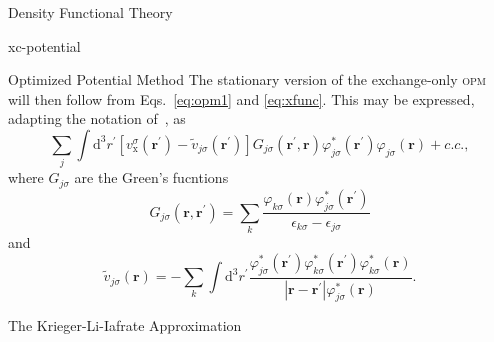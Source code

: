 \documentclass[letterpaper, 11 pt]{report}
\begin{document}
\begin{chapter}{Density Functional Theory \label{chap:dft}}
\begin{section}{xc-potential \label{sec:xcpot}}
\begin{subsection}{Optimized Potential Method \label{sec:opm}}
         The stationary version of the exchange-only \textsc{opm} will then follow from
         Eqs.~\eqref{eq:opm1} and \eqref{eq:xfunc}. This may be expressed, adapting the notation
         of~\cite{klieq}, as
         \begin{equation} \label{eq:opmEq}
            \sum\limits_j \int \mathrm{d}^3 r^\prime
            \left[ v^\sigma_\mathrm{x}(\mathbf{r}^\prime)
                 - \tilde{v}_{j \sigma} (\mathbf{r}^\prime) \right]
                 G_{j \sigma}(\mathbf{r}^\prime, \mathbf{r}) \varphi^*_{j \sigma} (\mathbf{r}^\prime)
                 \varphi_{j \sigma} (\mathbf{r}) + c.c.,
         \end{equation}
         where $G_{j \sigma}$ are the Green's fucntions
         \begin{equation}
            G_{j \sigma}(\mathbf{r}, \mathbf{r}^\prime) = \sum\limits_k
            \frac{\varphi_{k \sigma} (\mathbf{r}) \varphi^*_{j \sigma} (\mathbf{r}^\prime)}
            {\epsilon_{k \sigma} - \epsilon_{j \sigma}}
         \end{equation}
         and
         \begin{equation} \label{eq:tildev}
            \tilde{v}_{j \sigma} (\mathbf{r}) =  - \sum\limits_k \int \mathrm{d}^3 r^\prime
               \frac{ \varphi^*_{j \sigma} (\mathbf{r}^\prime) \varphi^*_{k \sigma} (\mathbf{r}^\prime)
                      \varphi^*_{k \sigma} (\mathbf{r}) }
                      {\left| \mathbf{r} - \mathbf{r}^\prime \right| \varphi^*_{j \sigma} (\mathbf{r})}.
         \end{equation}

      \end{subsection}

      \begin{subsection}{The Krieger-Li-Iafrate Approximation \label{sec:kli}}


\end{subsection}
\end{section}
\end{chapter}
\end{document}
